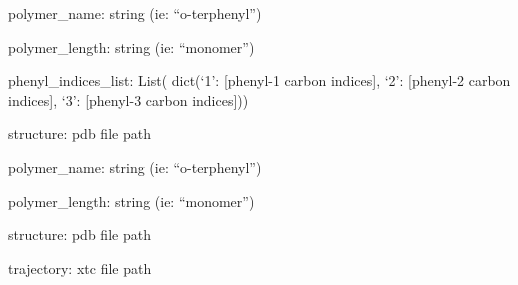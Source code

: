 \documentclass[letterpaper,12pt,english,openany,oneside]{sphinxmanual}
\begin{document}

\begin{fulllineitems}
\label{\detokenize{analysis:analysis.get_phenyl_carbon_indices}}
polymer\_name: string (ie: “o-terphenyl”)

polymer\_length: string (ie: “monomer”)

phenyl\_indices\_list: List( dict(‘1’: {[}phenyl-1 carbon indices{]}, ‘2’: {[}phenyl-2 carbon indices{]}, ‘3’: {[}phenyl-3 carbon indices{]}))

\end{fulllineitems}


\begin{fulllineitems}
\label{\detokenize{analysis:analysis.get_phenyl_centers_of_mass}}
structure: pdb file path

polymer\_name: string (ie: “o-terphenyl”)

polymer\_length: string (ie: “monomer”)

\end{fulllineitems}


\begin{fulllineitems}
\label{\detokenize{analysis:analysis.get_terminal_atoms}}
\end{fulllineitems}


\begin{fulllineitems}
\label{\detokenize{analysis:analysis.read_trajectory}}
structure: pdb file path

trajectory: xtc file path

\end{fulllineitems}
\end{document}
